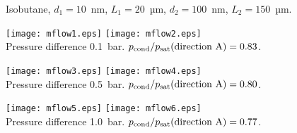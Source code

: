 \documentclass{minimal}
\begin{document}
\centerline{Isobutane, $d_1=10$~nm, $L_1 = 20$~µm, $d_2=100$~nm, $L_2=150$~µm.}

\raggedright\noindent
\texttt{[image: mflow1.eps]}
\texttt{[image: mflow2.eps]}\\
Pressure difference 0.1~bar.
$p_\mathrm{cond}/p_\mathrm{sat}(\hbox{direction A}) = 0.83$.
\bigskip

\texttt{[image: mflow3.eps]}
\texttt{[image: mflow4.eps]}\\
Pressure difference 0.5~bar.\bigskip
$p_\mathrm{cond}/p_\mathrm{sat}(\hbox{direction A}) = 0.80$.
\bigskip

\texttt{[image: mflow5.eps]}
\texttt{[image: mflow6.eps]}\\
Pressure difference 1.0~bar.\bigskip
$p_\mathrm{cond}/p_\mathrm{sat}(\hbox{direction A}) = 0.77$.
\end{document}
